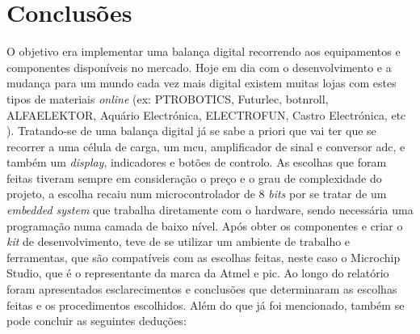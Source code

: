 \chapter{Conclusões}
O objetivo era implementar uma balança digital recorrendo aos equipamentos e componentes disponíveis no mercado. Hoje em dia com o desenvolvimento e a mudança para um mundo cada vez mais digital existem muitas lojas com estes tipos de materiais \textit{online} (ex: PTROBOTICS, Futurlec, botnroll, ALFAELEKTOR, Aquário Electrónica, ELECTROFUN, Castro Electrónica, etc ).
\emptyline
Tratando-se de uma balança digital já se sabe a priori que vai ter que se recorrer a uma célula de carga, um \acs{mcu}, amplificador de sinal e conversor \acs{adc}, e também um \textit{display}, indicadores e botões de controlo. As escolhas que foram feitas tiveram sempre em consideração o preço e o grau de complexidade do projeto, a escolha recaiu num microcontrolador de 8 \textit{bits} por se tratar de um \textit{embedded system} que trabalha diretamente com o hardware, sendo necessária uma programação numa camada de baixo nível.
\emptyline
Após obter os componentes e criar o \textit{kit} de desenvolvimento, teve de se utilizar um ambiente de trabalho e ferramentas, que são compatíveis com as escolhas feitas, neste caso o Microchip Studio, que é o representante da marca da Atmel e \acs{pic}.
\emptyline
Ao longo do relatório foram apresentados esclarecimentos e conclusões que determinaram as escolhas feitas e os procedimentos escolhidos. Além do que já foi mencionado, também se pode concluir as seguintes deduções:
\emptyline
